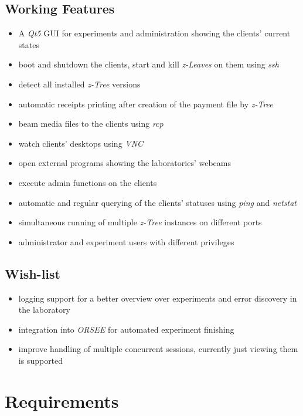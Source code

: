 \documentclass[a4paper,10pt]{article}
\begin{document}
\subsection{Working Features}

\begin{itemize}
  \item A \emph{Qt5} GUI for experiments and administration showing the clients' current states
  \item boot and shutdown the clients, start and kill \emph{z-Leaves} on them using \emph{ssh}
  \item detect all installed \emph{z-Tree} versions
  \item automatic receipts printing after creation of the payment file by \emph{z-Tree}
  \item beam media files to the clients using \emph{rcp}
  \item watch clients' desktops using \emph{VNC}
  \item open external programs showing the laboratories' webcams
  \item execute admin functions on the clients
  \item automatic and regular querying of the clients' statuses using \emph{ping} and \emph{netstat}
  \item simultaneous running of multiple \emph{z-Tree} instances on different ports
  \item administrator and experiment users with different privileges
\end{itemize}

\subsection{Wish-list}

\begin{itemize}
  \item logging support for a better overview over experiments and error discovery in the laboratory
  \item integration into \emph{ORSEE} for automated experiment finishing
  \item improve handling of multiple concurrent sessions, currently just viewing them is supported
\end{itemize}

\section{Requirements}
\end{document}
